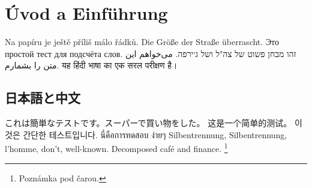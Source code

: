 \documentclass{article}
\begin{document}
\section{Úvod a Einführung}
Na papíru je ještě příliš málo řádků. Die Größe der Straße überrascht.
Это простой тест для подсчёта слов.
זהו מבחן פשוט של צה"ל ושל ג׳ירפה.
می‌خواهم این متن را بشمارم.
यह हिंदी भाषा का एक सरल परीक्षण है।
\subsection{日本語と中文}
これは簡単なテストです。スーパーで買い物をした。
这是一个简单的测试。
이것은 간단한 테스트입니다.
นี่คือการทดสอบ ง่ายๆ
Silben\-trennung, Silben­trennung, l’homme, don't, well-known.
Decomposed café and ﬁnance.
\footnote{Poznámka pod čarou.}
\end{document}
